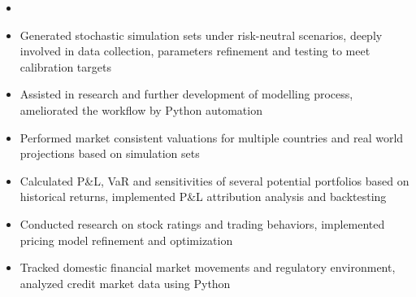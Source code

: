 \documentclass[10pt]{article}
\begin{document}
    \begin{itemize}
        \item 
    \end{itemize}
    \begin{itemize}
        \item Generated stochastic simulation sets under risk-neutral scenarios, deeply involved in data collection, parameters refinement and testing to meet calibration targets
        \item Assisted in research and further development of modelling process, ameliorated the workflow by Python automation
        \item Performed market consistent valuations for multiple countries and real world projections based on simulation sets
    \end{itemize}
    \begin{itemize}
        \item Calculated P\&L, VaR and sensitivities of several potential portfolios based on historical returns, implemented P\&L attribution analysis and backtesting
        \item Conducted research on stock ratings and trading behaviors, implemented pricing model refinement and optimization
        \item Tracked domestic financial market movements and regulatory environment, analyzed credit market data using Python
    \end{itemize}
\end{document}
